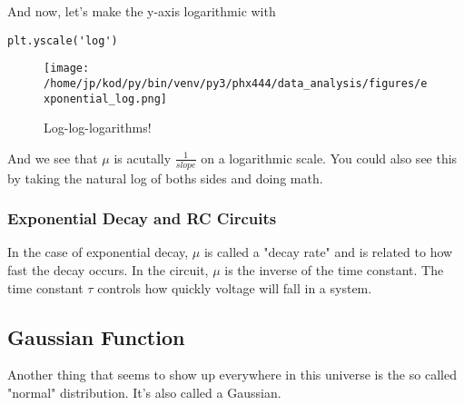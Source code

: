 \documentclass{article}
\begin{document}
And now, let's make the y-axis logarithmic with

\begin{center}
\begin{minipage}[t]{.75\textwidth}
\begin{lstlisting}[frame=tlrb]
plt.yscale('log')
\end{lstlisting}
\end{minipage}
\end{center}
\begin{figure}[H]
        \begin{center}
        \texttt{[image: /home/jp/kod/py/bin/venv/py3/phx444/data\_analysis/figures/exponential\_log.png]}
        \caption{Log-log-logarithms!}
        \label{fig:fig_12}
        \end{center}
\end{figure}

And we see that $\mu$ is acutally $\frac{1}{slope}$ on a logarithmic scale. You
could also see this by taking the natural log of boths sides and doing math.

\subsubsection{Exponential Decay and RC Circuits}
In the case of exponential decay, $\mu$ is called a "decay rate" and is related
to how fast the decay occurs. In the circuit, $\mu$ is the inverse of the time
constant. The time constant $\tau$ controls how quickly voltage will fall in a
system.

\subsection{Gaussian Function}
Another thing that seems to show up everywhere in this universe is the so
called "normal" distribution. It's also called a Gaussian.
\end{document}
